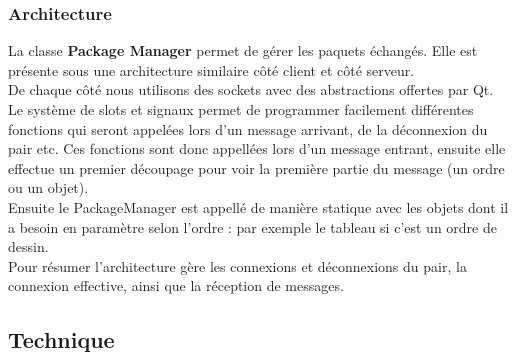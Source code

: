 \documentclass{report}
\begin{document}
			\subsubsection{Architecture}
				La classe \textbf{Package Manager} permet de gérer les paquets échangés. Elle est présente sous une architecture similaire côté client et côté serveur. \\
				De chaque côté nous utilisons des sockets avec des abstractions offertes par Qt. Le système de slots et signaux permet de programmer facilement différentes fonctions qui seront appelées lors d'un message arrivant, de la déconnexion du pair etc.
				Ces fonctions sont donc appellées lors d'un message entrant, ensuite elle effectue un premier découpage pour voir la première partie du message (un ordre ou un objet). \\ Ensuite le PackageManager est appellé de manière statique avec les objets dont il a besoin en paramètre selon l'ordre : par exemple le tableau si c'est un ordre de dessin. \\
				Pour résumer l'architecture gère les connexions et déconnexions du pair, la connexion effective, ainsi que la réception de messages. \\
				
		\subsection{Technique}
\end{document}
